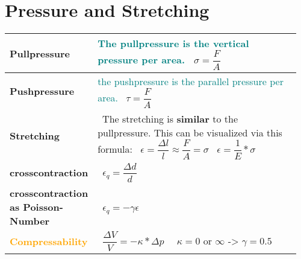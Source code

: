 \documentclass[main.tex,fontsize=8pt,paper=a4,paper=portrait,DIV=calc,]{scrartcl}
\begin{document}
\begin{table}[ht!]
\section{Pressure and Stretching}
\begin{tabular}{|m{0.2\linewidth}|m{0.755\linewidth}|}
\hline
\textbf{Pullpressure} & 
\textcolor{teal}{The pullpressure is the vertical pressure per area.}\newline
\, \newline
\large \( \sigma = \dfrac{F}{A} \)\newline
\normalsize \\
\hline
\textbf{Pushpressure} & 
\textcolor{teal}{the pushpressure is the parallel pressure per area.}\newline
\, \newline
\large \( \tau = \dfrac{F}{A} \)\newline
\normalsize \\
\hline
\textbf{Stretching} & 
\, \newline
The stretching is \textbf{similar} to the pullpressure.\newline
This can be visualized via this formula:\newline
\, \newline
\large \( \epsilon = \dfrac{\Delta l}{l} \approx \dfrac{F}{A} = \sigma \)\newline
\, \newline
\large \( \epsilon = \dfrac{1}{E} * \sigma \)
\, \newline
\normalsize \\
\hline
\textbf{crosscontraction} &
\, \newline
\large \( \epsilon_q = \dfrac{\Delta d}{d} \)
\, \newline
\normalsize \\
\hline
\textbf{crosscontraction as Poisson-Number} &
\, \newline
\large \( \epsilon_q = -\gamma \epsilon \)
\, \newline
\normalsize \\
\hline
\textbf{\textcolor{orange}{Compressability}} &
\, \newline
\large \( \dfrac{\Delta V}{V} = - \kappa * \Delta p  \)
\, \newline
\, \newline
\large \( \kappa = 0 \text{ or } \infty \text{ -> } \gamma = 0.5  \)
\, \newline
\normalsize \\
\hline
\end{tabular}
\end{table}
\end{document}
